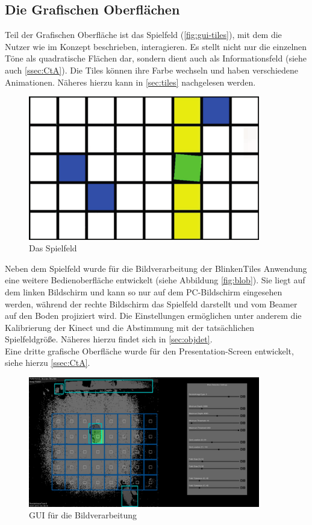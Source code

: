 \subsection{Die Grafischen Oberflächen}

Teil der Grafischen Oberfläche ist das Spielfeld (\autoref{fig:gui-tiles}), mit dem die Nutzer wie im Konzept beschrieben, interagieren. Es stellt nicht nur die einzelnen Töne als quadratische Flächen dar, sondern dient auch als Informationsfeld (siehe auch \autoref{ssec:CtA}). Die Tiles können ihre Farbe wechseln und haben verschiedene Animationen. Näheres hierzu kann in \autoref{sec:tiles} nachgelesen werden.

\begin{figure}[htbp] 
  \centering
     \includegraphics[width=0.9\textwidth]{images/gui-tiles}
  \caption{Das Spielfeld}
  \label{fig:gui-tiles}
\end{figure}

Neben dem Spielfeld wurde für die Bildverarbeitung der BlinkenTiles Anwendung eine weitere Bedienoberfläche entwickelt (siehe Abbildung \autoref{fig:blob}). Sie liegt auf dem linken Bildschirm und kann so nur auf dem PC-Bildschirm eingesehen werden, während der rechte Bildschirm das Spielfeld darstellt und vom Beamer auf den Boden projiziert wird. Die Einstellungen ermöglichen unter anderem die Kalibrierung der Kinect und die Abstimmung mit der tatsächlichen Spielfeldgröße. Näheres hierzu findet sich in \autoref{sec:objdet}.\\
Eine dritte grafische Oberfläche wurde für den Presentation-Screen entwickelt, siehe hierzu \autoref{ssec:CtA}.

\begin{figure}[htbp] 
  \centering
     \includegraphics[width=0.9\textwidth]{images/Blob}
  \caption{GUI für die Bildverarbeitung}
  \label{fig:blob}
\end{figure}
